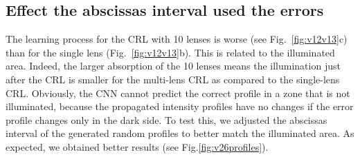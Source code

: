 \documentclass[preprint]{iucr}
\begin{document}
\subsection{Effect the abscissas interval used the errors}
The learning process for the CRL with 10 lenses is worse (see Fig.~\ref{fig:v12v13}c) than for the single lens (Fig.~\ref{fig:v12v13}b). This is related to the illuminated area. Indeed, the larger absorption of the 10 lenses means the illumination just after the CRL is smaller for the multi-lens CRL as compared to the single-lens CRL. Obviously, the CNN cannot predict the correct profile in a zone that is not illuminated, because the propagated intensity profiles have no changes if the error profile changes only in the dark side. To test this, we adjusted the abscissas interval of the generated random profiles to better match the illuminated area. As expected, we obtained better results (see Fig.\ref{fig:v26profiles}).
\end{document}
